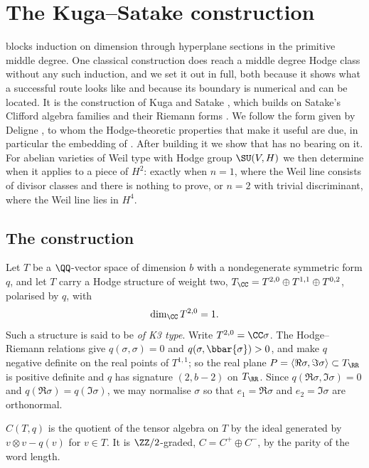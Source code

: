 \section{The Kuga--Satake construction}\label{sec:ks}

 blocks induction on dimension through hyperplane
sections in the primitive middle degree. One classical construction does reach
a middle degree Hodge class without any such induction, and we set it out in
full, both because it shows what a successful route looks like and because
its boundary is numerical and can be located. It is the construction of Kuga
and Satake \cite{KS67}, which builds on Satake's Clifford algebra families and
their Riemann forms \cite{Sat66}. We follow the form given by Deligne
\cite{Del72}, to whom the Hodge-theoretic properties that make it useful are
due, in particular the embedding of . After building it we
show that  has no bearing on it. For abelian varieties of
Weil type with Hodge group $\SU(V,H)$ we then determine when it applies to a
piece of $H^{2}$: exactly when $n=1$, where the Weil line consists of divisor
classes and there is nothing to prove, or $n=2$ with trivial discriminant,
where the Weil line lies in $H^{4}$.

\subsection{The construction}

\begin{setupenv}[K3 type]\label{setup:k3type}
Let $T$ be a $\QQ$-vector space of dimension $b$ with a nondegenerate
symmetric form $q$, and let $T$ carry a Hodge structure of weight two,
$T_{\CC}=T^{2,0}\oplus T^{1,1}\oplus T^{0,2}$, polarised by $q$, with
\[
  \dim_{\CC}T^{2,0}=1 .
\]
Such a structure is said to be \emph{of K3 type}. Write $T^{2,0}=\CC\sigma$.
The Hodge--Riemann relations give $q(\sigma,\sigma)=0$ and
$q(\sigma,\bbar{\sigma})>0$, and make $q$ negative definite on the real points
of $T^{1,1}$; so the real plane
$P=\langle\Re\sigma,\Im\sigma\rangle\subset T_{\RR}$ is positive definite and
$q$ has signature $(2,b-2)$ on $T_{\RR}$. Since $q(\Re\sigma,\Im\sigma)=0$
and $q(\Re\sigma)=q(\Im\sigma)$, we may normalise $\sigma$ so that
$e_{1}=\Re\sigma$ and $e_{2}=\Im\sigma$ are orthonormal.
\end{setupenv}

\begin{definition}\label{def:clifford}
$C(T,q)$ is the quotient of the tensor algebra on $T$ by the ideal generated
by $v\otimes v-q(v)$ for $v\in T$. It is $\ZZ/2$-graded, $C=C^{+}\oplus C^{-}$,
by the parity of the word length.
\end{definition}

